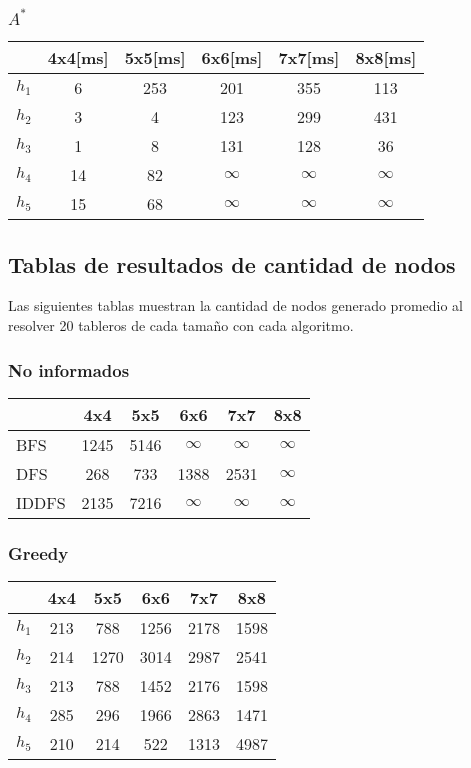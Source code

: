 \documentclass[%
    final,
    reprint,
    notitlepage,
    narroweqnarray,
    inline,
    twoside,
    invited
    ]{ieee}
\begin{document}
\subsubsection{$A^*$}
\begin{tabular}{l|c|c|c|c|c}
   & 4x4[ms] & 5x5[ms] & 6x6[ms] & 7x7[ms] & 8x8[ms] \\
  \hline
  $h_1$ & 6 & 253 & 201 & 355 & 113 \\
  $h_2$ & 3 & 4 & 123 & 299 & 431 \\
  $h_3$ & 1 & 8 & 131 & 128 & 36\\
  $h_4$ & 14 & 82 & $\infty$ & $\infty$ & $\infty$ \\
  $h_5$ & 15 & 68 & $\infty$ & $\infty$ & $\infty$ \\
\end{tabular}

\subsection{Tablas de resultados de cantidad de nodos}\label{anexo:tabla2}
Las siguientes tablas muestran la cantidad de nodos generado promedio al resolver 20 tableros de cada tama\~no con cada algoritmo.
\subsubsection{No informados}
\begin{tabular}{l|c|c|c|c|c}
   & 4x4 & 5x5 & 6x6 & 7x7 & 8x8 \\
  \hline
  BFS & 1245 & 5146 & $\infty$ & $\infty$ & $\infty$ \\
  DFS & 268 & 733 & 1388 & 2531 & $\infty$ \\
  IDDFS & 2135 & 7216 & $\infty$ & $\infty$ & $\infty$ \\
\end{tabular}
\subsubsection{Greedy}
\begin{tabular}{l|c|c|c|c|c}
   & 4x4 & 5x5 & 6x6 & 7x7 & 8x8 \\
  \hline
  $h_1$ & 213 & 788 & 1256 & 2178 & 1598 \\
  $h_2$ & 214 & 1270 & 3014 & 2987 & 2541 \\
  $h_3$ & 213 & 788 & 1452 & 2176 & 1598 \\
  $h_4$ & 285 & 296 & 1966 & 2863 & 1471 \\
  $h_5$ & 210 & 214 & 522 & 1313 & 4987 \\
\end{tabular}
\end{document}
